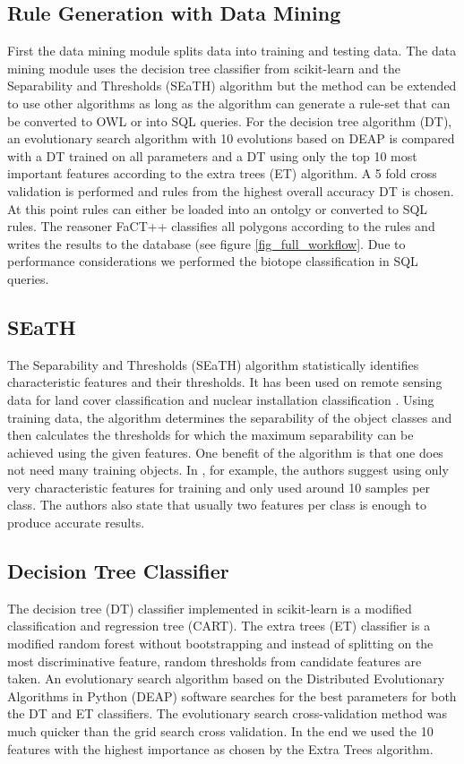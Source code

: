 \documentclass[authoryear, review,12pt,number]{elsarticle}
\begin{document}
\subsection{Rule Generation with Data Mining}
First the data mining module splits data into training and testing data. 
The data mining module uses the decision tree classifier from 
scikit-learn \citep{scikit-learn} and the Separability and Thresholds (SEaTH)
algorithm \citep{Nussbaum2006} but the method can be extended to use other
algorithms as long as the algorithm can generate a rule-set that can be
converted to OWL or into SQL queries.
For the decision tree algorithm (DT), an evolutionary search algorithm with 10 
evolutions based on DEAP is compared with a DT trained on all parameters and a 
DT using only the top 10 most important features according to the extra trees 
(ET) algorithm. A 5 fold cross validation is performed and rules from the 
highest overall accuracy DT is chosen. At this point rules can either be loaded 
into an ontolgy or converted to SQL rules. The reasoner FaCT++ classifies all 
polygons according to the rules and writes the results to the database (see 
figure \ref{fig_full_workflow}. Due to performance considerations we  
performed the biotope classification in SQL queries. 
\subsection{SEaTH}
The Separability and Thresholds (SEaTH) algorithm \citep{Nussbaum2006}
statistically identifies characteristic features and their thresholds. It has
been used on remote sensing data for land cover classification \citep{Gao2011}
and nuclear installation classification \citep{Nussbaum2006}. Using training
data, the algorithm determines the separability of the object classes and then
calculates the thresholds for which the maximum separability can be achieved
using the given features. One benefit of the algorithm is that one does not
need many training objects. In \cite{Nussbaum2006}, for example, the authors
suggest using only very characteristic features for training and only used
around 10 samples per class. The authors also state that usually two features
per class is enough to produce accurate results.\\
\subsection{Decision Tree Classifier}
The decision tree (DT) classifier implemented in scikit-learn is a modified
classification and regression tree (CART)\citep{scikit-learn}. The extra trees
(ET) classifier is a modified random forest without bootstrapping and instead of
splitting on the most discriminative feature, random thresholds from candidate
features are taken.
An evolutionary search algorithm based on the Distributed Evolutionary
Algorithms in Python (DEAP) \citep{DEAP_JMLR2012} software searches
for the best parameters for both the DT and ET classifiers. The evolutionary
search cross-validation method was much quicker than the grid search cross
validation. In the end we used the 10 features with the highest 
importance as chosen by the Extra Trees algorithm. 
\end{document}
